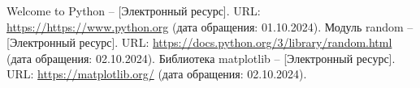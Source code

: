 \begin{thebibliography}{}
    Welcome to Python -- [Электронный ресурс]. URL: \url{https://https://www.python.org} (дата обращения: 01.10.2024).
    Модуль random -- [Электронный ресурс]. URL: \url{https://docs.python.org/3/library/random.html} (дата обращения: 02.10.2024).
    Библиотека matplotlib -- [Электронный ресурс]. URL: \url{https://matplotlib.org/} (дата обращения: 02.10.2024).
\end{thebibliography}